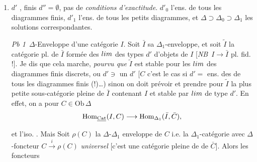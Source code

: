 \documentclass[11pt,a4paper]{article}
\begin{document}
\begin{enumerate}
  \item[(3)] $d'$    , \struck{\ill{}} 
    finis $d'' = \emptyset$, pas de \emph{conditions
    d'exactitude}. $d'_{0}$ l'ens. de tous les diagrammes finis,
    $d'_{1}$ l'ens. de tous les petits diagrammes, et $\Delta \supset
    \Delta_{0} \supset \Delta_{1}$ les solutions correspondantes.

    \emph{Pb 1}\ $\Delta$-Enveloppe  d'une
    catégorie $I$. Soit $\bar{I}$ \struck{\ill{}} 
    sa $\Delta_{1}$-enveloppe, et soit $\tilde{I}$ la
    catégorie pl. de $\bar{I}$ formée des
    $\varprojlim$ des types $d'$ d'objets de $I$ [\emph{NB}\ $I \to
    \bar{I}$ pl. fid. !]. Je dis que cela marche, \emph{pourvu que}
    \ill{}  \ill{} $\tilde{I}$ est stable pour
    les $\varprojlim$ des diagrammes finis discrets, ou $d' \ni$ un $d'$
    \ill{} [$C$ c'est le cas si $d' =$ ens. des \ill{} de tous les
    diagrammes finis (!)…) sinon on doit prévoir et prendre pour
    $\tilde{I}$ la plus petite sous-catégorie  pleine de
    $\bar{I}$ contenant $I$ et stable par $\varprojlim$ de type $d'$.
    En effet, on a pour $C \in \mathrm{Ob}\,\Delta$
    \[
      \mathrm{Hom}_{\struck{\mathrm{Cat}}}(I, C) \longrightarrow
      \mathrm{Hom}_{\Delta_{1}}(\bar{I}, \bar{C}),
    \]
     et l'iso.    . Mais
    \struck{\ill{}} Soit $\rho(C)$ la $\Delta$-$\Delta_{1}$ enveloppe de
    $C$ i.e. la $\Delta_{1}$-catégorie  avec
    $\Delta$-foncteur $C \xrightarrow{\ i\ } \rho(C)$
    \emph{universel} [c'est une catégorie pleine de 
    de $\bar{C}$].     Alors les foncteurs

\end{enumerate}
\end{document}
